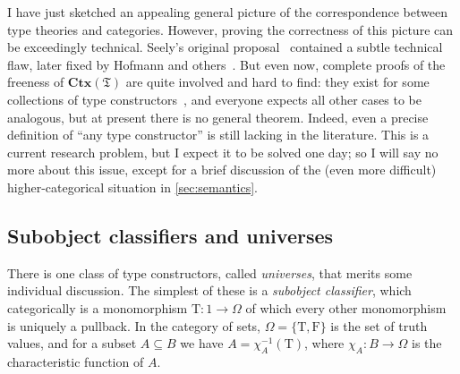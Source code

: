 \documentclass[10pt]{article}
\def\true{\mathrm{T}}
\def\false{\mathrm{F}}
\def\fT{\mathfrak{T}}
\def\CtxT{\mathbf{Ctx}(\fT)}
\numberwithin{equation}{section}
\begin{document}
I have just sketched an appealing general picture of the correspondence between type theories and categories.
However, proving the correctness of this picture can be exceedingly technical.
Seely's original proposal~\cite{seely:lccc-tt} contained a subtle technical flaw, later fixed by Hofmann and others~\cite{curien:subst,hofmann:ttinlccc,hofmann:ssdts,cd:lccc-tt}. %
But even now, complete proofs of the freeness of $\CtxT$ are quite involved and hard to find: they exist for some collections of type constructors~\cite{ls:hocl,jacobs:cltt,ptj:elephant,cd:lccc-tt,streicher:semtt}, and everyone expects all other cases to be analogous, but at present there is no general theorem. %
Indeed, even a precise definition of ``any type constructor'' is still lacking in the literature.
This is a current research problem, but I expect it to be solved one day; so I will say no more about this issue, except for a brief discussion of the (even more difficult) higher-categorical situation in \cref{sec:semantics}.



\subsection{Subobject classifiers and universes}
\label{sec:universes}

% 

There is one class of type constructors, called \emph{universes}, that merits some individual discussion.
The simplest of these is a \emph{subobject classifier}, which categorically is a monomorphism $\true:1\to \Omega$ of which every other monomorphism is uniquely a pullback. %
In the category of sets, $\Omega = \{\true,\false\}$ is the set of truth values, and for a subset $A\subseteq B$ we have $A = \chi_A^{-1}(\true)$, where $\chi_A:B\to \Omega$ is the characteristic function of $A$.
\end{document}
